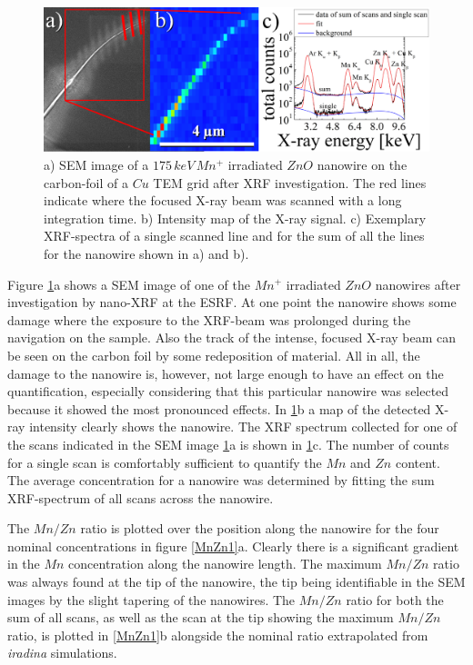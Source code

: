 \begin{figure}[h]
	\centering
		\includegraphics[width=.8\textwidth]{images/XRFSEM.png}
	\caption{a) SEM image of a $175\,keV\,Mn^+$ irradiated $ZnO$ nanowire on the carbon-foil of a $Cu$ TEM grid after XRF investigation. The red lines indicate where the focused X-ray beam was scanned with a long integration time. b) Intensity map of the X-ray signal. c) Exemplary XRF-spectra of a single scanned line and for the sum of all the lines for the nanowire shown in a) and b).} 
	\label{XRFSEM}
\end{figure} 


Figure \ref{XRFSEM}a shows a SEM image of one of the $Mn^+$ irradiated $ZnO$ nanowires after investigation by nano-XRF at the ESRF. At one point the nanowire shows some damage where the exposure to the XRF-beam was prolonged during the navigation on the sample. Also the track of the intense, focused X-ray beam can be seen on the carbon foil by some redeposition of material. All in all, the damage to the nanowire is, however, not large enough to have an effect on the quantification, especially considering that this particular nanowire was selected because it showed the most pronounced effects. In \ref{XRFSEM}b a map of the detected X-ray intensity clearly shows the nanowire. The XRF spectrum collected for one of the scans indicated in the SEM image \ref{XRFSEM}a is shown in \ref{XRFSEM}c. The number of counts for a single scan is comfortably sufficient to quantify the $Mn$ and $Zn$ content. The average concentration for a nanowire was determined by fitting the sum XRF-spectrum of all scans across the nanowire.

The $Mn/Zn$ ratio is plotted over the position along the nanowire for the four nominal concentrations in figure \ref{MnZn1}a. Clearly there is a significant gradient in the $Mn$ concentration along the nanowire length. The maximum $Mn/Zn$ ratio was always found at the tip of the nanowire, the tip being identifiable in the SEM images by the slight tapering of the nanowires. The $Mn/Zn$ ratio for both the sum of all scans, as well as the scan at the tip showing the maximum $Mn/Zn$ ratio, is plotted in \ref{MnZn1}b alongside the nominal ratio extrapolated from \emph{iradina} simulations.

